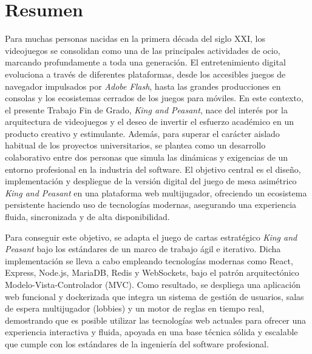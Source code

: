 \chapter*{Resumen}
Para muchas personas nacidas en la primera década del siglo XXI, los videojuegos se consolidan como una de las principales actividades de ocio, marcando profundamente a toda una generación. El entretenimiento digital evoluciona a través de diferentes plataformas, desde los accesibles juegos de navegador impulsados por \textit{Adobe Flash}, hasta las grandes producciones en consolas y los ecosistemas cerrados de los juegos para móviles. En este contexto, el presente Trabajo Fin de Grado, \textit{King and Peasant}, nace del interés por la arquitectura de videojuegos y el deseo de invertir el esfuerzo académico en un producto creativo y estimulante. Además, para superar el carácter aislado habitual de los proyectos universitarios, se plantea como un desarrollo colaborativo entre dos personas que simula las dinámicas y exigencias de un entorno profesional en la industria del software. El objetivo central es el diseño, implementación y despliegue de la versión digital del juego de mesa asimétrico \textit{King and Peasant} en una plataforma web multijugador, ofreciendo un ecosistema persistente haciendo uso de tecnologías modernas, asegurando una experiencia fluida, sincronizada y de alta disponibilidad.

Para conseguir este objetivo, se adapta el juego de cartas estratégico \textit{King and Peasant} bajo los estándares de un marco de trabajo ágil e iterativo. Dicha implementación se lleva a cabo empleando tecnologías modernas como React, Express, Node.js, MariaDB, Redis y WebSockets, bajo el patrón arquitectónico Modelo-Vista-Controlador (MVC). Como resultado, se despliega una aplicación web funcional y dockerizada que integra un sistema de gestión de usuarios, salas de espera multijugador (lobbies) y un motor de reglas en tiempo real, demostrando que es posible utilizar las tecnologías web actuales para ofrecer una experiencia interactiva y fluida, apoyada en una base técnica sólida y escalable que cumple con los estándares de la ingeniería del software profesional.